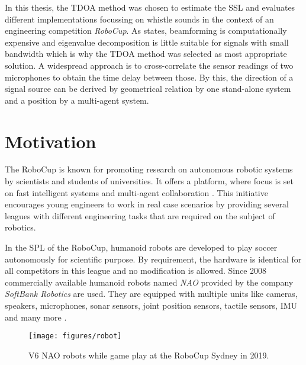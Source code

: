 In this thesis, the \ac{TDOA} method was chosen to estimate the \ac{SSL} and evaluates
different implementations focussing on whistle sounds in the context of an engineering competition
\textit{\ac{RoboCup}}.
As \cite{BAS_estimator} states, beamforming is computationally expensive and eigenvalue
decomposition is little suitable
for signals with small bandwidth which is why the \ac{TDOA} method was selected as most
appropriate solution.
A widespread approach is to cross-correlate the sensor readings of two microphones
to obtain the time delay between those.
By this, the direction of a signal source can be derived by geometrical relation by one
stand-alone system and a position by a multi-agent system.

\section{Motivation}

The \acf{RoboCup} is known for promoting research on autonomous robotic systems
by scientists and students of universities.
It offers a platform, where focus is set on fast intelligent systems and multi-agent
collaboration \cite{robocup}.
This initiative encourages young engineers to work in real case scenarios
by providing several leagues with different engineering tasks that are required
on the subject of robotics.

In the \ac{SPL} of the \ac{RoboCup}, humanoid robots are developed to play soccer autonomously
for scientific purpose.
By requirement, the hardware is identical for all competitors in this league and no modification
is allowed.
Since 2008 commercially available humanoid robots named \textit{NAO} provided by the
company \textit{SoftBank Robotics} are used.
They are equipped with multiple units like cameras, speakers, microphones, sonar sensors,
joint position sensors, tactile sensors, \ac{IMU} and many more \cite{nao_docu}.
\begin{figure}[ht]
	\centering
        \texttt{[image: figures/robot]}
	\caption[NAO robot]{V6 NAO robots while game play at the \ac{RoboCup} Sydney in 2019.}
	\label{fig:01_robot}
\end{figure}


